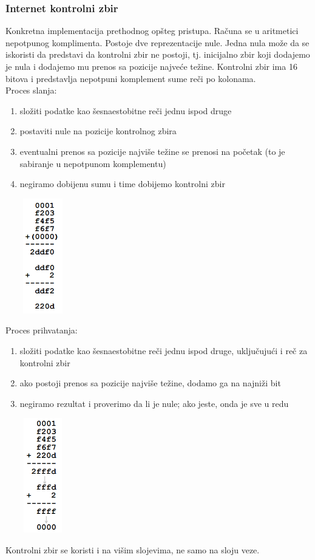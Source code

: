 \documentclass{article} %
\begin{document}
\subsubsection{Internet kontrolni zbir}
Konkretna implementacija prethodnog opšteg pristupa. Računa se u aritmetici nepotpunog komplimenta. Postoje dve reprezentacije nule. Jedna nula može da se iskoristi da predstavi da kontrolni zbir ne postoji, tj. inicijalno zbir koji dodajemo je nula i dodajemo mu prenos sa pozicije najveće težine. Kontrolni zbir ima 16 bitova i predstavlja nepotpuni komplement sume reči po kolonama.\\
Proces slanja:\\
\begin{enumerate}
\item složiti podatke kao šesnaestobitne reči jednu ispod druge
\item postaviti nule na pozicije kontrolnog zbira
\item eventualni prenos sa pozicije najviše težine  se prenosi na početak (to je sabiranje u nepotpunom komplementu)
\item negiramo dobijenu sumu i time dobijemo kontrolni zbir
\begin{center}
\includegraphics[width=2cm, height=5cm]{kontZbir}\\
\end{center}
\end{enumerate}
Proces prihvatanja:
\begin{enumerate}
\item složiti podatke kao šesnaestobitne reči jednu ispod druge, uključujući i reč za kontrolni zbir
\item ako postoji prenos sa pozicije najviše težine, dodamo ga na najniži bit
\item  negiramo rezultat i proverimo da li je nule; ako jeste, onda je sve u redu
\begin{center}
\includegraphics[width=2cm, height=5cm]{kontZbir2}\\
\end{center}
\end{enumerate}
Kontrolni zbir se koristi i na višim slojevima, ne samo na sloju veze.
\end{document}
